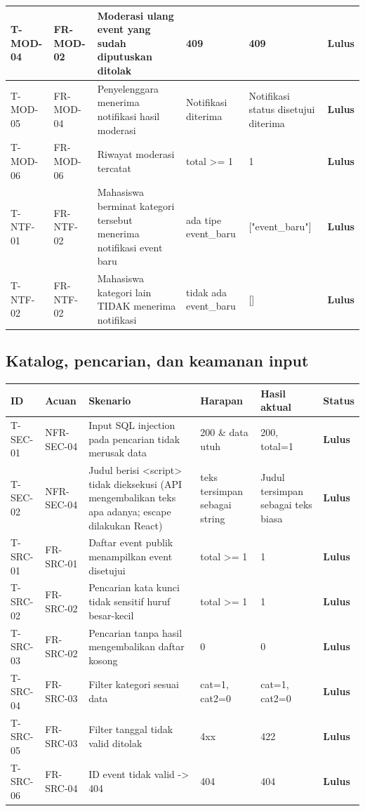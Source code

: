\documentclass[11pt,a4paper]{article}
\renewcommand{\arraystretch}{1.2}
\begin{document}
{\begin{longtable}{p{1.8cm}p{1.9cm}p{4.0cm}p{2.4cm}p{3.4cm}p{1.2cm}}
\midrule
\mbox{T-MOD-04} & FR-MOD-02 & Moderasi ulang event yang sudah diputuskan ditolak & 409 & 409 & \textbf{Lulus}\\
\midrule
\mbox{T-MOD-05} & FR-MOD-04 & Penyelenggara menerima notifikasi hasil moderasi & Notifikasi diterima & Notifikasi status disetujui diterima & \textbf{Lulus}\\
\midrule
\mbox{T-MOD-06} & FR-MOD-06 & Riwayat moderasi tercatat & total \textgreater{}= 1 & 1 & \textbf{Lulus}\\
\midrule
\mbox{T-NTF-01} & FR-NTF-02 & Mahasiswa berminat kategori tersebut menerima notifikasi event baru & ada tipe event\_baru & ["event\_baru"] & \textbf{Lulus}\\
\midrule
\mbox{T-NTF-02} & FR-NTF-02 & Mahasiswa kategori lain TIDAK menerima notifikasi & tidak ada event\_baru & [] & \textbf{Lulus}\\
\midrule
\bottomrule
\end{longtable}}
\subsection{Katalog, pencarian, dan keamanan input}
{\footnotesize\setlength{\parskip}{0pt}\renewcommand{\arraystretch}{1.15}
\begin{longtable}{p{1.8cm}p{1.9cm}p{4.0cm}p{2.4cm}p{3.4cm}p{1.2cm}}
\toprule ID & Acuan & Skenario & Harapan & Hasil aktual & Status\\\midrule\endhead
\mbox{T-SEC-01} & NFR-SEC-04 & Input SQL injection pada pencarian tidak merusak data & 200 \& data utuh & 200, total=1 & \textbf{Lulus}\\
\midrule
\mbox{T-SEC-02} & NFR-SEC-04 & Judul berisi \textless{}script\textgreater{} tidak dieksekusi (API mengembalikan teks apa adanya; escape dilakukan React) & teks tersimpan sebagai string & Judul tersimpan sebagai teks biasa & \textbf{Lulus}\\
\midrule
\mbox{T-SRC-01} & FR-SRC-01 & Daftar event publik menampilkan event disetujui & total \textgreater{}= 1 & 1 & \textbf{Lulus}\\
\midrule
\mbox{T-SRC-02} & FR-SRC-02 & Pencarian kata kunci tidak sensitif huruf besar-kecil & total \textgreater{}= 1 & 1 & \textbf{Lulus}\\
\midrule
\mbox{T-SRC-03} & FR-SRC-02 & Pencarian tanpa hasil mengembalikan daftar kosong & 0 & 0 & \textbf{Lulus}\\
\midrule
\mbox{T-SRC-04} & FR-SRC-03 & Filter kategori sesuai data & cat=1, cat2=0 & cat=1, cat2=0 & \textbf{Lulus}\\
\midrule
\mbox{T-SRC-05} & FR-SRC-03 & Filter tanggal tidak valid ditolak & 4xx & 422 & \textbf{Lulus}\\
\midrule
\mbox{T-SRC-06} & FR-SRC-04 & ID event tidak valid -\textgreater{} 404 & 404 & 404 & \textbf{Lulus}\\
\midrule
\bottomrule
\end{longtable}}
\end{document}
